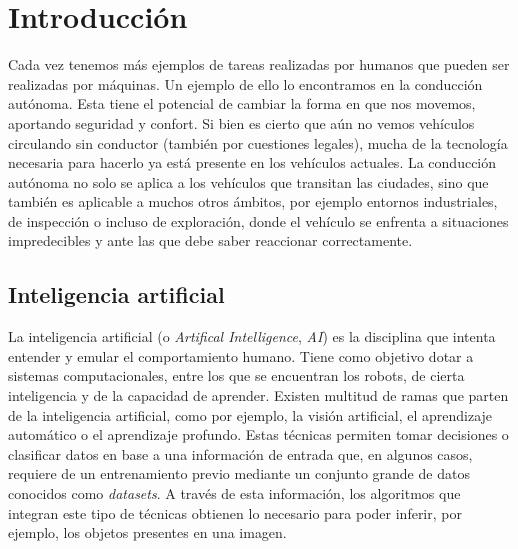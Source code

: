 \chapter{Introducción}
\label{cap:capitulo1}
\setcounter{page}{1}

Cada vez tenemos más ejemplos de tareas realizadas por humanos que pueden ser realizadas por máquinas. Un ejemplo de ello lo encontramos en la conducción autónoma. Esta tiene el potencial de cambiar la forma en que nos movemos, aportando seguridad y confort. Si bien es cierto que aún no vemos vehículos circulando sin conductor (también por cuestiones legales), mucha de la tecnología necesaria para hacerlo ya está presente en los vehículos actuales. La conducción autónoma no solo se aplica a los vehículos que transitan las ciudades, sino que también es aplicable a muchos otros ámbitos, por ejemplo entornos industriales, de inspección o incluso de exploración, donde el vehículo se enfrenta a situaciones impredecibles y ante las que debe saber reaccionar correctamente.\\

\section{Inteligencia artificial}
\label{sec:ia}
La inteligencia artificial (o \textit{Artifical Intelligence}, \textit{AI}) es la disciplina que intenta entender y emular el comportamiento humano. Tiene como objetivo dotar a sistemas computacionales, entre los que se encuentran los robots, de cierta inteligencia y de la capacidad de aprender. Existen multitud de ramas que parten de la inteligencia artificial, como por ejemplo, la visión artificial, el aprendizaje automático o el aprendizaje profundo. Estas técnicas permiten tomar decisiones o clasificar datos en base a una información de entrada que, en algunos casos, requiere de un entrenamiento previo mediante un conjunto grande de datos conocidos como \textit{datasets}. A través de esta información, los algoritmos que integran este tipo de técnicas obtienen lo necesario para poder inferir, por ejemplo, los objetos presentes en una imagen.\\

